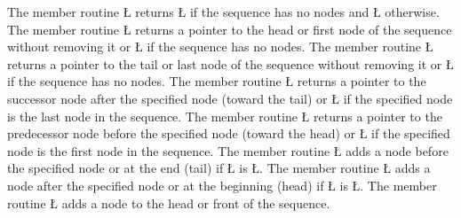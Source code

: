 \documentclass[openright,twoside]{report}
\begin{document}
The member routine \LGinlinetrue\LGbegin\lgrinde\L{}\endlgrinde\LGend{} returns \LGinlinetrue\LGbegin\lgrinde\L{}\endlgrinde\LGend{} if the sequence has no nodes and \LGinlinetrue\LGbegin\lgrinde\L{}\endlgrinde\LGend{} otherwise.
The member routine \LGinlinetrue\LGbegin\lgrinde\L{}\endlgrinde\LGend{} returns a pointer to the head or first node of the sequence without removing it or \LGinlinetrue\LGbegin\lgrinde\L{}\endlgrinde\LGend{} if the sequence has no nodes.
The member routine \LGinlinetrue\LGbegin\lgrinde\L{}\endlgrinde\LGend{} returns a pointer to the tail or last node of the sequence without removing it or \LGinlinetrue\LGbegin\lgrinde\L{}\endlgrinde\LGend{} if the sequence has no nodes.
The member routine \LGinlinetrue\LGbegin\lgrinde\L{}\endlgrinde\LGend{} returns a pointer to the successor node after the specified node (toward the tail) or \LGinlinetrue\LGbegin\lgrinde\L{}\endlgrinde\LGend{} if the specified node is the last node in the sequence.
The member routine \LGinlinetrue\LGbegin\lgrinde\L{}\endlgrinde\LGend{} returns a pointer to the predecessor node before the specified node (toward the head) or \LGinlinetrue\LGbegin\lgrinde\L{}\endlgrinde\LGend{} if the specified node is the first node in the sequence.
The member routine \LGinlinetrue\LGbegin\lgrinde\L{}\endlgrinde\LGend{} adds a node before the specified node or at the end (tail) if \LGinlinetrue\LGbegin\lgrinde\L{}\endlgrinde\LGend{} is \LGinlinetrue\LGbegin\lgrinde\L{}\endlgrinde\LGend{}.
The member routine \LGinlinetrue\LGbegin\lgrinde\L{}\endlgrinde\LGend{} adds a node after the specified node or at the beginning (head) if \LGinlinetrue\LGbegin\lgrinde\L{}\endlgrinde\LGend{} is \LGinlinetrue\LGbegin\lgrinde\L{}\endlgrinde\LGend{}.
The member routine \LGinlinetrue\LGbegin\lgrinde\L{}\endlgrinde\LGend{} adds a node to the head or front of the sequence.
\end{document}
